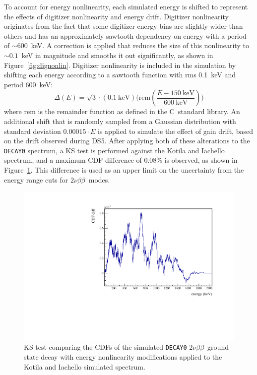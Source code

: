 \documentclass[notitlepage,rmp,aps,10pt]{revtex4-1}
\newcommand{\tnbb}{${2 \nu \beta \beta}$}
\newcommand{\cpp}{C\protect\raisebox{.25ex}{++}\ }  %
\begin{document}
To account for energy nonlinearity, each simulated energy is shifted to represent the effects of digitizer nonlinearity and energy drift.
Digitizer nonlinearity originates from the fact that some digitizer energy bins are slightly wider than others and has an approximately sawtooth dependency on energy with a period of ${\sim}600$~keV.
A correction is applied that reduces the size of this nonlinearity to ${\sim}0.1$~keV in magnitude and smooths it out significantly, as shown in Figure~\ref{fig:dignonlin}.
Digitizer nonlinearity is included in the simulation by shifting each energy according to a sawtooth function with rms 0.1~keV and period 600~keV:
\begin{equation}
  \Delta(E) = \sqrt{3}\cdot (0.1~\mathrm{keV}) \big(\mathrm{rem}(\frac{E-150~\mathrm{keV}}{600~\mathrm{keV}}) \big)
\end{equation}
where $\mathrm{rem}$ is the remainder function as defined in the \cpp standard library.
An additional shift that is randomly sampled from a Gaussian distribution with standard deviation $0.00015\cdot E$ is applied to simulate the effect of gain drift, based on the drift observed during DS5.
After applying both of these alterations to the \texttt{DECAY0} spectrum, a KS test is performed against the Kotila and Iachello spectrum, and a maximum CDF difference of 0.08\% is observed, as shown in Figure~\ref{fig:decay0NLCks}.
This difference is used as an upper limit on the uncertainty from the energy range cuts for \tnbb\ modes.
\begin{figure}[h]
  \centering
  \includegraphics[width=0.6\linewidth]{decay0KS}
  \caption[KS Test of decay0 spectrum with energy non-linearities vs Iachello spectrum]{\label{fig:decay0NLCks}
    KS test comparing the CDFs of the simulated \texttt{DECAY0} \tnbb\ ground state decay with energy nonlinearity modifications applied to the Kotila and Iachello simulated spectrum.
  }
\end{figure}
\end{document}
